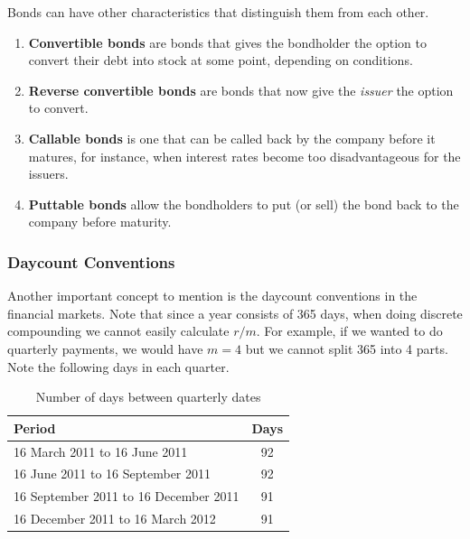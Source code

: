\documentclass{article}
\begin{document}
    \begin{definition}
      Bonds can have other characteristics that distinguish them from each other. 
      \begin{enumerate}
        \item \textbf{Convertible bonds} are bonds that gives the bondholder the option to convert their debt into stock at some point, depending on conditions.
        \item \textbf{Reverse convertible bonds} are bonds that now give the \textit{issuer} the option to convert.
        \item \textbf{Callable bonds} is one that can be called back by the company before it matures, for instance, when interest rates become too disadvantageous for the issuers.
        \item \textbf{Puttable bonds} allow the bondholders to put (or sell) the bond back to the company before maturity.
      \end{enumerate}
    \end{definition}

    \subsubsection{Daycount Conventions}

      Another important concept to mention is the daycount conventions in the financial markets. Note that since a year consists of 365 days, when doing discrete compounding we cannot easily calculate $r/m$. For example, if we wanted to do quarterly payments, we would have $m = 4$ but we cannot split 365 into 4 parts. Note the following days in each quarter. 

      \begin{table}[H]
        \centering
        \caption{Number of days between quarterly dates}
        \label{table:quarterly_days}
        \begin{tabular}{@{}lc@{}}
        \toprule
        Period                               & Days \\ \midrule
        16 March 2011 to 16 June 2011        & 92   \\
        16 June 2011 to 16 September 2011    & 92   \\
        16 September 2011 to 16 December 2011& 91   \\
        16 December 2011 to 16 March 2012    & 91   \\ \bottomrule
        \end{tabular}
      \end{table}
      
\end{document}

